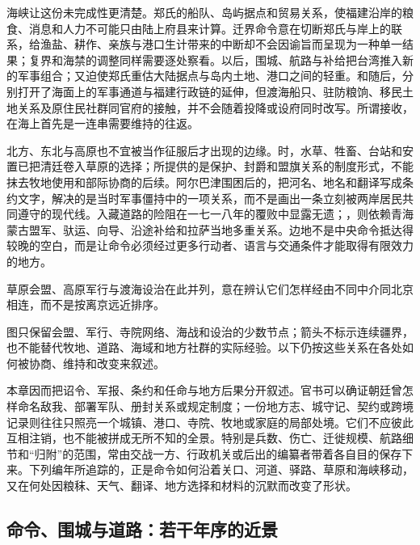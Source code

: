 海峡让这份未完成性更清楚。郑氏的船队、岛屿据点和贸易关系，使福建沿岸的粮食、消息和人力不可能只由陆上府县来计算。迁界命令意在切断郑氏与岸上的联系，给渔盐、耕作、亲族与港口生计带来的中断却不会因谕旨而呈现为一种单一结果；复界和海禁的调整同样需要逐处察看。以后，围城、航路与补给把台湾推入新的军事组合；又迫使郑氏重估大陆据点与岛内土地、港口之间的轻重。和随后，分别打开了海面上的军事通道与福建行政链的延伸，但渡海船只、驻防粮饷、移民土地关系及原住民社群同官府的接触，并不会随着投降或设府同时改写。所谓接收，在海上首先是一连串需要维持的往返。

北方、东北与高原也不宜被当作征服后才出现的边缘。时，水草、牲畜、台站和安置已把清廷卷入草原的选择；所提供的是保护、封爵和盟旗关系的制度形式，不能抹去牧地使用和部际协商的后续。阿尔巴津围困后的，把河名、地名和翻译写成条约文字，解决的是当时军事僵持中的一项关系，而不是画出一条立刻被两岸居民共同遵守的现代线。入藏道路的险阻在一七一八年的覆败中显露无遗；，则依赖青海蒙古盟军、驮运、向导、沿途补给和拉萨当地多重关系。边地不是中央命令抵达得较晚的空白，而是让命令必须经过更多行动者、语言与交通条件才能取得有限效力的地方。

\noindent 草原会盟、高原军行与渡海设治在此并列，意在辨认它们怎样经由不同中介同北京相连，而不是按离京远近排序。

图只保留会盟、军行、寺院网络、海战和设治的少数节点；箭头不标示连续疆界，也不能替代牧地、道路、海域和地方社群的实际经验。以下仍按这些关系在各处如何被协商、维持和改变来叙述。

本章因而把诏令、军报、条约和任命与地方后果分开叙述。官书可以确证朝廷曾怎样命名敌我、部署军队、册封关系或规定制度；一份地方志、城守记、契约或跨境记录则往往只照亮一个城镇、港口、寺院、牧地或家庭的局部处境。它们不应彼此互相注销，也不能被拼成无所不知的全景。特别是兵数、伤亡、迁徙规模、航路细节和“归附”的范围，常由交战一方、行政机关或后出的编纂者带着各自目的保存下来。下列编年所追踪的，正是命令如何沿着关口、河道、驿路、草原和海峡移动，又在何处因粮秣、天气、翻译、地方选择和材料的沉默而改变了形状。

\subsection*{命令、围城与道路：若干年序的近景}

